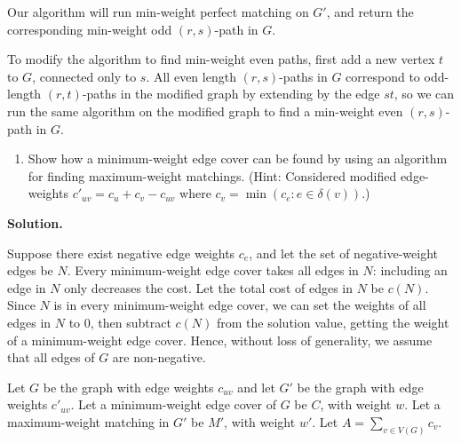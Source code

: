 \documentclass[11pt,letterpaper]{article}
\theoremstyle{definition}
\newcommand{\solution}{\medskip\noindent\textbf{Solution.}\par\medskip}
\begin{document}
Our algorithm will run min-weight perfect matching on $G'$, and return the corresponding min-weight odd $(r,s)$-path in $G$.

To modify the algorithm to find min-weight even paths, first add a new vertex $t$ to $G$, connected only to $s$. 
All even length $(r,s)$-paths in $G$ correspond to odd-length $(r,t)$-paths in the modified graph by extending by the edge $st$, so we can run the same algorithm on the modified graph to find a min-weight even $(r,s)$-path in $G$.


\begin{enumerate}[resume=q]
\item Show how a minimum-weight edge cover can be found by using an algorithm for finding maximum-weight matchings. (Hint: Considered modified edge-weights $c'_{uv} = c_u + c_v - c_{uv}$ where $c_v = \min(c_e : e \in \delta(v))$.)
\end{enumerate}

\solution
Suppose there exist negative edge weights $c_e$, and let the set of negative-weight edges be $N$. 
Every minimum-weight edge cover takes all edges in $N$:
including an edge in $N$ only decreases the cost.
Let the total cost of edges in $N$ be $c(N)$. 
Since $N$ is in every minimum-weight edge cover, we can set the weights of all edges in $N$ to 0, then subtract $c(N)$ from the solution value, getting the weight of a minimum-weight edge cover.
Hence, without loss of generality, we assume that all edges of $G$ are non-negative.

Let $G$ be the graph with edge weights $c_{uv}$ and let $G'$ be the graph with edge weights $c'_{uv}$.
Let a minimum-weight edge cover of $G$ be $C$, with weight $w$. 
Let a maximum-weight matching in $G'$ be $M'$, with weight $w'$.
Let $A=\sum_{v\in V(G)} c_v$.
\end{document}
